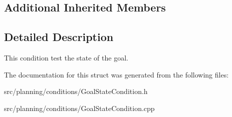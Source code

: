 \subsection*{Additional Inherited Members}


\subsection{Detailed Description}
This condition test the state of the goal. 

The documentation for this struct was generated from the following files\+:\begin{DoxyCompactItemize}
\item 
src/planning/conditions/Goal\+State\+Condition.\+h\item 
src/planning/conditions/Goal\+State\+Condition.\+cpp\end{DoxyCompactItemize}
